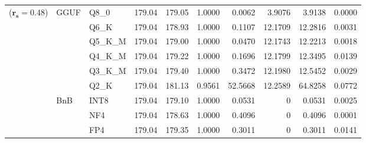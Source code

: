 \begin{longtable}{ll l rrrrrrr}
{\small ($\mathbf{r_s{=}0.48}$)} & GGUF & Q8\_0 & 179.04 & 179.05 & 1.0000 & 0.0062 & 3.9076 & 3.9138 & 0.0000 \\
 &  & Q6\_K & 179.04 & 178.93 & 1.0000 & 0.1107 & 12.1709 & 12.2816 & 0.0031 \\
 &  & Q5\_K\_M & 179.04 & 179.00 & 1.0000 & 0.0470 & 12.1743 & 12.2213 & 0.0018 \\
 &  & Q4\_K\_M & 179.04 & 179.22 & 1.0000 & 0.1696 & 12.1799 & 12.3495 & 0.0139 \\
 &  & Q3\_K\_M & 179.04 & 179.40 & 1.0000 & 0.3472 & 12.1980 & 12.5452 & 0.0029 \\
 &  & Q2\_K & 179.04 & 181.13 & 0.9561 & 52.5668 & 12.2589 & 64.8258 & 0.0772 \\
 & BnB & INT8 & 179.04 & 179.10 & 1.0000 & 0.0531 & \cellcolor{cyan!12} $0$ & 0.0531 & 0.0025 \\
 &  & NF4 & 179.04 & 178.63 & 1.0000 & 0.4096 & \cellcolor{cyan!12} $0$ & 0.4096 & 0.0001 \\
 &  & FP4 & 179.04 & 179.35 & 1.0000 & 0.3011 & \cellcolor{cyan!12} $0$ & 0.3011 & 0.0141 \\
\end{longtable}
\endgroup